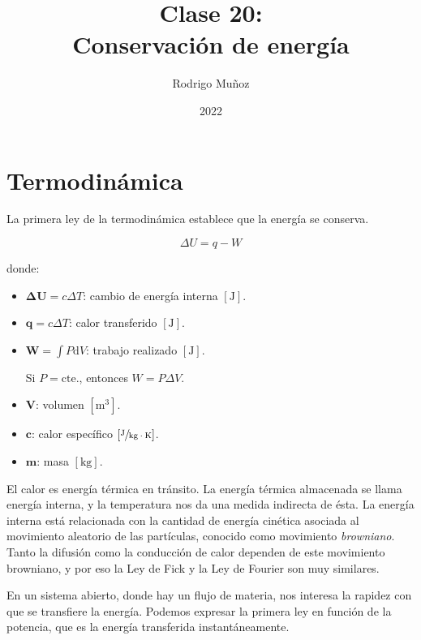 \documentclass[11pt]{article}
\title{Clase 20: \\ Conservación de energía}
\author{Rodrigo Muñoz}
\date{2022}
\begin{document}
\maketitle

\section{Termodinámica}

La primera ley de la termodinámica establece que la energía se conserva.

\[ \boxed{ \Delta U = q - W } \]

donde:

\begin{itemize}
    \item \( \mathbf{ \Delta U } = c \Delta T \): cambio de energía interna \( \left[ \text{J} \right] \).
    
    \item \( \mathbf{q} = c \Delta T \): calor transferido \( \left[ \text{J} \right] \).
    
    \item \( \mathbf{W} = \int P \mathrm d V \): trabajo realizado \( \left[ \text{J} \right] \).
    
    Si \( P = \text{cte.} \), entonces \( W = P \Delta V \).

    \item \( \mathbf{V} \): volumen \( \left[ \text{m}^3 \right] \).
    
    \item \( \mathbf{c} \): calor específico \( \left[ \sfrac{\text{J}}{\text{kg} \cdot \text{K}} \right] \).
    
    \item \( \mathbf{m} \): masa \( \left[ \text{kg} \right] \).
\end{itemize}

El calor es energía térmica en tránsito. La energía térmica almacenada se llama energía interna, y la temperatura nos da una medida indirecta de ésta. La energía interna está relacionada con la cantidad de energía cinética asociada al movimiento aleatorio de las partículas, conocido como movimiento \textit{browniano}. Tanto la difusión como la conducción de calor dependen de este movimiento browniano, y por eso la Ley de Fick y la Ley de Fourier son muy similares.

En un sistema abierto, donde hay un flujo de materia, nos interesa la rapidez con que se transfiere la energía. Podemos expresar la primera ley en función de la potencia, que es la energía transferida instantáneamente.
\end{document}
